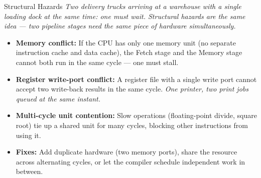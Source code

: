 \documentclass{beamer}
\begin{document}
\begin{frame}{Structural Hazards}
  \textit{Two delivery trucks arriving at a warehouse with a single loading dock
  at the same time: one must wait. Structural hazards are the same idea ---
  two pipeline stages need the same piece of hardware simultaneously.}

  \medskip
  \begin{itemize}
    \item \textbf{Memory conflict:} If the CPU has only one memory unit (no
          separate instruction cache and data cache), the Fetch stage and the
          Memory stage cannot both run in the same cycle --- one must stall.
    \item \textbf{Register write-port conflict:} A register file with a single
          write port cannot accept two write-back results in the same cycle.
          \textit{One printer, two print jobs queued at the same instant.}
    \item \textbf{Multi-cycle unit contention:} Slow operations (floating-point
          divide, square root) tie up a shared unit for many cycles, blocking
          other instructions from using it.
    \item \textbf{Fixes:} Add duplicate hardware (two memory ports), share the
          resource across alternating cycles, or let the compiler schedule
          independent work in between.
  \end{itemize}
\end{frame}
\end{document}
